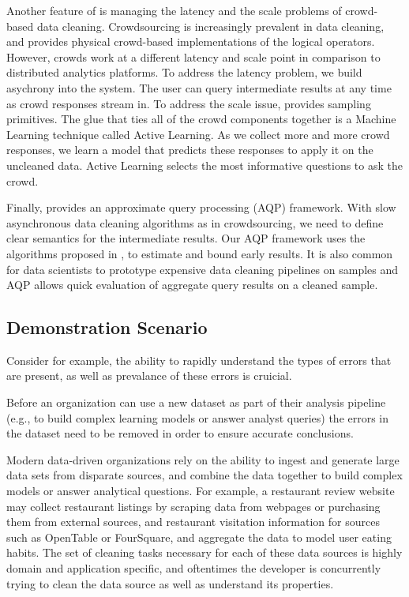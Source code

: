 Another feature of \projx is managing the latency and the scale problems of crowd-based data cleaning. 
Crowdsourcing is increasingly prevalent in data cleaning, and \projx provides physical crowd-based implementations
of the logical operators.
However, crowds work at a different latency and scale point in comparison to distributed analytics platforms.
To address the latency problem, we build asychrony into the system.
The user can query intermediate results at any time as crowd responses stream in.
To address the scale issue, \projx provides sampling primitives.
The glue that ties all of the crowd components together is a Machine Learning technique called Active Learning.
As we collect more and more crowd responses, we learn a model that predicts these responses to apply it on the uncleaned data.
Active Learning selects the most informative questions to ask the crowd.

Finally, \projx provides an approximate query processing (AQP) framework.
With slow asynchronous data cleaning algorithms as in crowdsourcing, we need 
to define clear semantics for the intermediate results.
Our AQP framework uses the algorithms proposed in \cite{wang1999sample}, to estimate and bound early results.
It is also common for data scientists to prototype expensive data cleaning pipelines on samples and AQP allows quick evaluation of
aggregate query results on a cleaned sample.

\subsection{Demonstration Scenario}

\fi




Consider for example, the ability to rapidly understand the types of errors that are present, as well as prevalance of 
these errors is cruicial.



Before an organization can use a new dataset as part of their analysis pipeline
(e.g., to build complex learning models or answer analyst queries)
the errors in the dataset need to be removed in order to ensure accurate conclusions.  

Modern data-driven organizations rely on the ability to ingest and generate large data sets from 
disparate sources, and combine the data together to build complex models or answer analytical questions.  
For example, a restaurant review website may collect restaurant listings by scraping data from webpages or purchasing them from external sources, and
restaurant visitation information for sources such as OpenTable or FourSquare, and aggregate the data to
model user eating habits.  
The set of cleaning tasks necessary for each of these data sources is highly domain and application specific,
and oftentimes the developer is concurrently trying to clean the data source as well as understand its properties.


